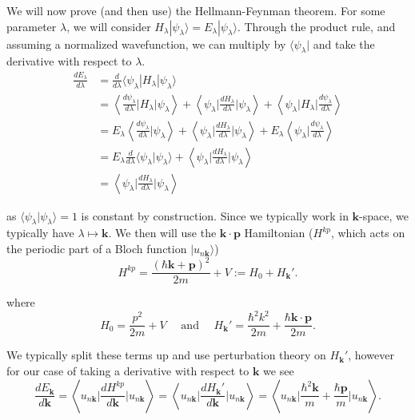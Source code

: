 \documentclass[12pt]{revtex4-2}
\begin{document}
We will now prove (and then use) the Hellmann-Feynman theorem.  For some parameter $\lambda$, we will consider $H_\lambda |\psi_\lambda\rangle = E_\lambda |\psi_\lambda \rangle$.  Through the product rule, and assuming a normalized wavefunction, we can multiply by $\langle \psi_\lambda|$ and take the derivative with respect to $\lambda$.
\begin{align}
    \frac{dE_\lambda}{d\lambda} &= \frac{d}{d\lambda}\langle \psi_\lambda | H_\lambda | \psi_\lambda\rangle \\
    &= \left\langle \frac{d\psi_\lambda}{d\lambda} \bigg| H_\lambda \bigg| \psi_\lambda \right\rangle + \left\langle \psi_\lambda \bigg| \frac{dH_\lambda}{d\lambda} \bigg| \psi_\lambda \right\rangle + \left\langle \psi_\lambda \bigg| H_\lambda \bigg| \frac{d\psi_\lambda}{d\lambda} \right\rangle \\
    &= E_\lambda \left\langle \frac{d\psi_\lambda}{d\lambda} \bigg| \psi_\lambda \right\rangle + \left\langle \psi_\lambda \bigg| \frac{dH_\lambda}{d\lambda} \bigg| \psi_\lambda \right\rangle + E_\lambda \left\langle \psi_\lambda \bigg| \frac{d\psi_\lambda}{d\lambda} \right\rangle \\
    &= E_\lambda \frac{d}{d\lambda} \langle \psi_\lambda | \psi_\lambda \rangle + \left\langle \psi_\lambda \bigg| \frac{dH_\lambda}{d\lambda} \bigg| \psi_\lambda \right\rangle \\
    &= \left\langle \psi_\lambda \bigg| \frac{dH_\lambda}{d\lambda} \bigg| \psi_\lambda \right\rangle
\end{align}

as $\langle \psi_\lambda | \psi_\lambda \rangle=1$ is constant by construction.  Since we typically work in $\mathbf{k}$-space, we typically have $\lambda \mapsto \mathbf{k}$.  We then will use the $\mathbf{k}\cdot\mathbf{p}$ Hamiltonian ($H^{kp}$, which acts on the periodic part of a Bloch function $|u_{n\mathbf{k}}\rangle$)
\begin{equation}
    H^{kp} = \frac{(\hbar\mathbf{k} + \mathbf{p})^2}{2m} + V := H_0 + H_\mathbf{k}'.
\end{equation}

where
\begin{equation}
    H_0 = \frac{p^2}{2m} + V \quad \text{ and } \quad H_\mathbf{k}' = \frac{\hbar^2 k^2}{2m} + \frac{\hbar \mathbf{k}\cdot\mathbf{p}}{2m}.
\end{equation}

We typically split these terms up and use perturbation theory on $H_\mathbf{k}'$, however for our case of taking a derivative with respect to $\mathbf{k}$ we see
\begin{equation}
    \frac{dE_\mathbf{k}}{d\mathbf{k}} = \left\langle u_{n\mathbf{k}} \bigg| \frac{d H^{kp}}{d\mathbf{k}} \bigg| u_{n\mathbf{k}} \right\rangle = \left\langle u_{n\mathbf{k}} \bigg| \frac{d H_\mathbf{k}'}{d\mathbf{k}} \bigg| u_{n\mathbf{k}} \right\rangle = \left\langle u_{n\mathbf{k}} \bigg| \frac{\hbar^2 \mathbf{k}}{m} + \frac{\hbar\mathbf{p}}{m} \bigg| u_{n\mathbf{k}} \right\rangle.
\end{equation}
\end{document}
